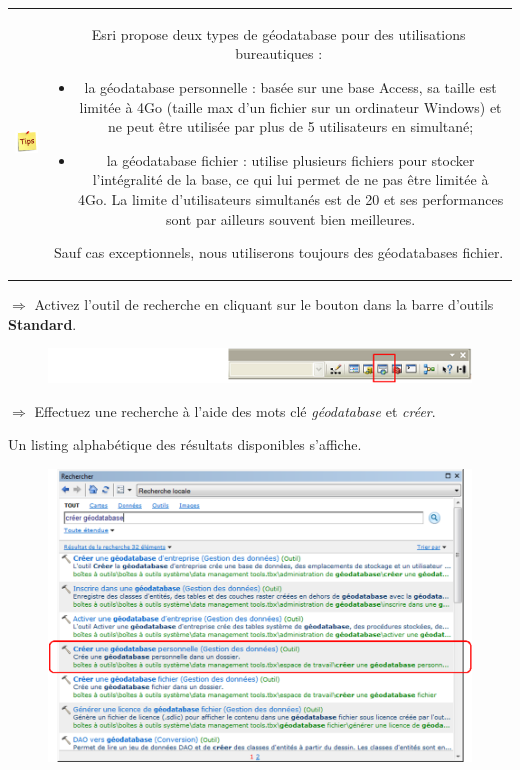 \documentclass[11pt]{article}
\newcommand{\action}{$\Rightarrow$ }
\newenvironment{note}{%
	\begin{tabular}[t t]{c c}
		\includegraphics{img/tips.png}
		 &
		\begin{minipage}[c]{0.9\linewidth}
			\begin{sffamily}
}{%
			\end{sffamily}
		\end{minipage}
	\end{tabular}
}
\begin{document}
\begin{note}
Esri propose deux types de géodatabase pour des utilisations bureautiques :
\begin{itemize}
	\item la géodatabase personnelle : basée sur une base Access, sa taille est limitée à 4Go (taille max d'un fichier sur un ordinateur Windows) et ne peut être utilisée par plus de 5 utilisateurs en simultané;
	\item la géodatabase fichier : utilise plusieurs fichiers pour stocker l'intégralité de la base, ce qui lui permet de ne pas être limitée à 4Go. La limite d'utilisateurs simultanés est de 20 et ses performances sont par ailleurs souvent bien meilleures.
\end{itemize}
Sauf cas exceptionnels, nous utiliserons toujours des géodatabases fichier.
\end{note}

\action Activez l'outil de recherche en cliquant sur le bouton dans la barre d'outils \textbf{Standard}.
\begin{figure}[H]
	\center \includegraphics{img/td3/arctoolbox_bouton_recherche.png}\\
\end{figure}

\action Effectuez une recherche à l'aide des mots clé \textit{géodatabase} et \textit{créer}.

Un listing alphabétique des résultats disponibles s'affiche.

\begin{figure}[H]
	\center \includegraphics{img/td3/arctoolbox_recherche.png}\\
\end{figure}
\end{document}
